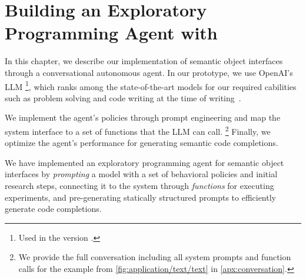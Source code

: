 
\chapter{Building an Exploratory Programming Agent with \gptfouro}
\label{cha:agent}

In this chapter, we describe our implementation of semantic object interfaces through a conversational autonomous agent.
In our prototype, we use OpenAI's LLM \gptfouro\footnote{Used in the version .}, which ranks among the state-of-the-art models for our required cabilities such as problem solving and code writing at the time of writing~\cite{openai2024gpt4}.

We implement the agent's policies through prompt engineering and map the system interface to a set of functions that the LLM can call.%
\footnote{We provide the full conversation including all system prompts and function calls for the example from \cref{fig:application/text/text} in \cref{apx:conversation}.} %
Finally, we optimize the agent's performance for generating semantic code completions.


\begin{summary}
	We have implemented an exploratory programming agent for semantic object interfaces by \emph{prompting} a \gptfouro model with a set of behavioral policies and initial research steps, connecting it to the system through \emph{functions} for executing experiments, and pre-generating statically structured prompts to efficiently generate code completions.
\end{summary}
